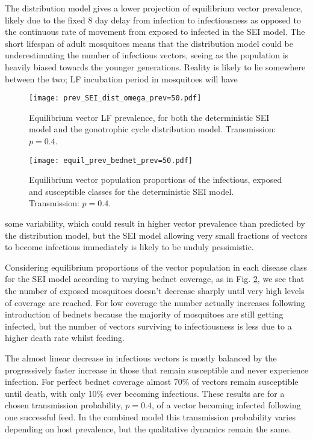 \documentclass[5p,times]{elsarticle}
\begin{document}
The distribution model gives a lower projection of equilibrium vector prevalence, likely due to the fixed 8 day delay from infection to infectiousness as opposed to the continuous rate of movement from exposed to infected in the SEI model. The short lifespan of adult mosquitoes means that the distribution model could be underestimating the number of infectious vectors, seeing as the population is heavily biased towards the younger generations. Reality is likely to lie somewhere between the two; LF incubation period in mosquitoes will have \begin{figure}[h]
\begin{center}
\texttt{[image: prev\_SEI\_dist\_omega\_prev=50.pdf]}
\caption{Equilibrium vector LF prevalence, for both the deterministic SEI model and the gonotrophic cycle distribution model. Transmission: $p=0.4$.}
\label{fig:LLIN_comp}
\end{center}
\end{figure}
\begin{figure}[h]
\begin{center}
\texttt{[image: equil\_prev\_bednet\_prev=50.pdf]}
\caption{Equilibrium vector population proportions of the infectious, exposed and susceptible classes for the deterministic SEI model. Transmission: $p=0.4$.}
\label{fig:LLIN_SEI}
\end{center}
\end{figure} some variability, which could result in higher vector prevalence than predicted by the distribution model, but the SEI model allowing very small fractions of vectors to become infectious immediately is likely to be unduly pessimistic.

Considering equilibrium proportions of the vector population in each disease class for the SEI model according to varying bednet coverage, as in Fig. \ref{fig:LLIN_SEI}, we see that the number of exposed mosquitoes doesn't decrease sharply until very high levels of coverage are reached. For low coverage the number actually increases following introduction of bednets because the majority of mosquitoes are still getting infected, but the number of vectors surviving to infectiousness is less due to a higher death rate whilst feeding. 

The almost linear decrease in infectious vectors is mostly balanced by the progressively faster increase in those that remain susceptible and never experience infection. For perfect bednet coverage almost 70\% of vectors remain susceptible until death, with only 10\% ever becoming infectious. These results are for a chosen transmission probability, $p=0.4$, of a vector becoming infected following one successful feed. In the combined model this transmission probability varies depending on host prevalence, but the qualitative dynamics remain the same.
\end{document}
